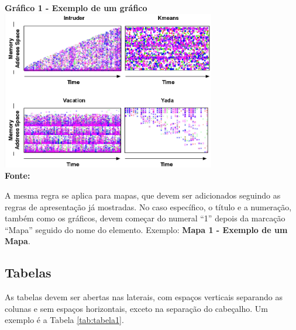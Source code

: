 \begin{center}
	\centering	
 	\textbf{Gráfico 1 - Exemplo de um gráfico} \\
	\includegraphics[width=0.7\textwidth]{figuras/access.png}
	 \vspace{-0.3cm}
	\\\textbf{\footnotesize Fonte: \cite{tese}}
	\label{grafico1}
\end{center}

A mesma regra se aplica para mapas, que devem ser adicionados seguindo as regras de apresentação já mostradas. No caso específico,
o título e a numeração, também como os gráficos, devem começar do numeral ``1'' depois da marcação ``Mapa'' seguido do nome do elemento.
Exemplo: \textbf{Mapa 1 - Exemplo de um Mapa}.

 \subsection{\esp Tabelas}

As tabelas devem ser abertas nas laterais, com espaços verticais separando
as colunas e sem espaços horizontais, exceto na
separação do cabeçalho. Um exemplo é a Tabela \ref{tab:tabela1}. 

